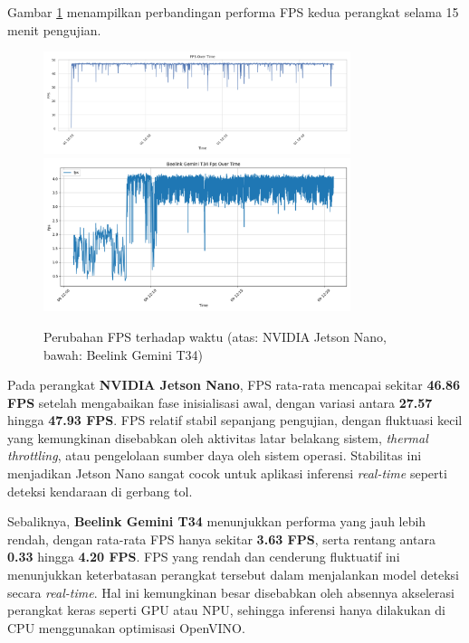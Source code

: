 Gambar \ref{fig:fps_over_time} menampilkan perbandingan performa FPS kedua perangkat selama 15 menit pengujian. 

\begin{figure}[htbp]
  \centering
  \includegraphics[width=0.8\textwidth]{gambar/bab4-jetson-fps-over-time.png}
  \includegraphics[width=0.8\textwidth]{gambar/bab4-beelink-fps-over-time.png}
  \caption{\centering Perubahan FPS terhadap waktu (atas: NVIDIA Jetson Nano, bawah: Beelink Gemini T34)}
  \label{fig:fps_over_time}
\end{figure}

Pada perangkat \textbf{NVIDIA Jetson Nano}, FPS rata-rata mencapai sekitar \textbf{46.86 FPS} setelah mengabaikan fase inisialisasi awal, dengan variasi antara \textbf{27.57} hingga \textbf{47.93 FPS}. FPS relatif stabil sepanjang pengujian, dengan fluktuasi kecil yang kemungkinan disebabkan oleh aktivitas latar belakang sistem, \emph{thermal throttling}, atau pengelolaan sumber daya oleh sistem operasi. Stabilitas ini menjadikan Jetson Nano sangat cocok untuk aplikasi inferensi \emph{real-time} seperti deteksi kendaraan di gerbang tol.

Sebaliknya, \textbf{Beelink Gemini T34} menunjukkan performa yang jauh lebih rendah, dengan rata-rata FPS hanya sekitar \textbf{3.63 FPS}, serta rentang antara \textbf{0.33} hingga \textbf{4.20 FPS}. FPS yang rendah dan cenderung fluktuatif ini menunjukkan keterbatasan perangkat tersebut dalam menjalankan model deteksi secara \emph{real-time}. Hal ini kemungkinan besar disebabkan oleh absennya akselerasi perangkat keras seperti GPU atau NPU, sehingga inferensi hanya dilakukan di CPU menggunakan optimisasi OpenVINO.

